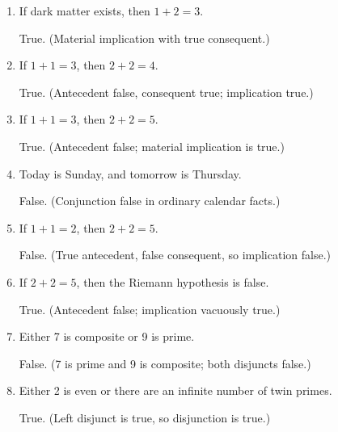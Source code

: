 \begin{enumerate}
\begin{enumerate}[label=\Alph*.]
    \item If dark matter exists, then $1+2=3$.\\
    \begin{subanswer}
      True. (Material implication with true consequent.)
    \end{subanswer}

    \item If $1+1=3$, then $2+2=4$.\\
    \begin{subanswer}
      True. (Antecedent false, consequent true; implication true.)
    \end{subanswer}

    \item If $1+1=3$, then $2+2=5$.\\
    \begin{subanswer}
      True. (Antecedent false; material implication is true.)
    \end{subanswer}

    \item Today is Sunday, and tomorrow is Thursday.\\
    \begin{subanswer}
      False. (Conjunction false in ordinary calendar facts.)
    \end{subanswer}

    \item If $1+1=2$, then $2+2=5$.\\
    \begin{subanswer}
      False. (True antecedent, false consequent, so implication false.)
    \end{subanswer}

    \item If $2+2=5$, then the Riemann hypothesis is false.\\
    \begin{subanswer}
      True. (Antecedent false; implication vacuously true.)
    \end{subanswer}

    \item Either 7 is composite or 9 is prime.\\
    \begin{subanswer}
      False. (7 is prime and 9 is composite; both disjuncts false.)
    \end{subanswer}

    \item Either 2 is even or there are an infinite number of twin primes.\\
    \begin{subanswer}
      True. (Left disjunct  is true, so disjunction is true.)
    \end{subanswer}


\end{enumerate}
\end{enumerate}
